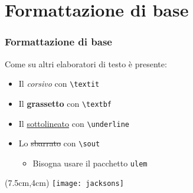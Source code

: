 \section{Formattazione di base}
\begin{frame}
 \frametitle{Formattazione di base}
 
 Come su altri elaboratori di testo è presente:
 \begin{itemize}
  \item<1-> Il \textit{corsivo} con \texttt{\textbackslash textit}
  \item<2-> Il \textbf{grassetto} con \texttt{\textbackslash textbf}
  \item<3-> Il \underline{sottolineato} con \texttt{\textbackslash underline}
  \item<4-> Lo \sout{sbarrato} con \texttt{\textbackslash sout}
  \begin{itemize}
   \item Bisogna usare il pacchetto \texttt{ulem}
  \end{itemize}

 \end{itemize}
 
 \begin{textblock*}{5cm}(7.5cm,4cm)
   \texttt{[image: jacksons]}
 \end{textblock*}
\end{frame}
